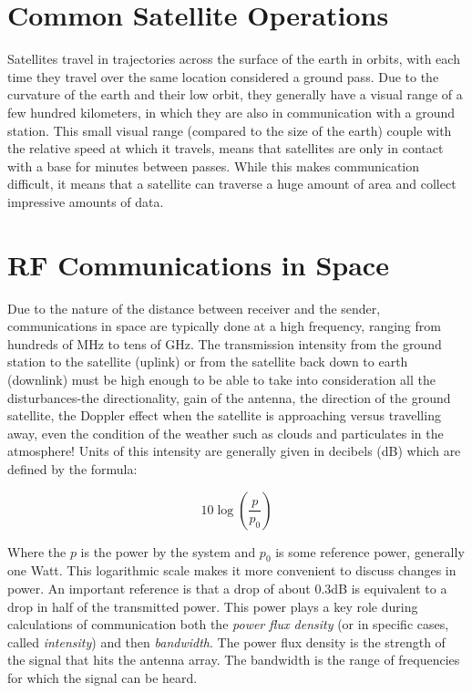 \documentclass[12pt, twoside]{report}
\begin{document}
\section{Common Satellite Operations}
\par Satellites travel in trajectories across the surface of the earth in orbits, with each time they travel over the same location considered a ground pass.
Due to the curvature of the earth and their low orbit, they generally have a visual range of a few hundred kilometers, in which they are also in communication with a ground station.
This small visual range (compared to the size of the earth) couple with the relative speed at which it travels, means that satellites are only in contact with a base for minutes between passes.
While this makes communication difficult, it means that a satellite can traverse a huge amount of area and collect impressive amounts of data.


\section{RF Communications in Space}
\par Due to the nature of the distance between receiver and the sender, communications in space are typically done at a high frequency, ranging from hundreds of MHz to tens of GHz.
The transmission intensity from the ground station to the satellite (uplink) or from the satellite back down to earth (downlink) must be high enough to be able to take into consideration all the disturbances-the directionality, gain of the antenna, the direction of the ground satellite, the Doppler effect when the satellite is approaching versus travelling away, even the condition of the weather such as clouds and particulates in the atmosphere! Units of this intensity are generally given in decibels (dB) which are defined by the formula:

\begin{equation}
    10\log(\frac{p}{p_0})
\end{equation}

Where the $p$ is the power by the system and $p_0$ is some reference power, generally one Watt. This logarithmic scale makes it more convenient to discuss changes in power. An important reference is that a drop of about 0.3dB is equivalent to a drop in half of the transmitted power. This power plays a key role during calculations of communication both the \textit{power flux density} (or in specific cases, called \textit{intensity}) and then \textit{bandwidth}. The power flux density is the strength of the signal that hits the antenna array. The bandwidth is the range of frequencies for which the signal can be heard.
\end{document}

